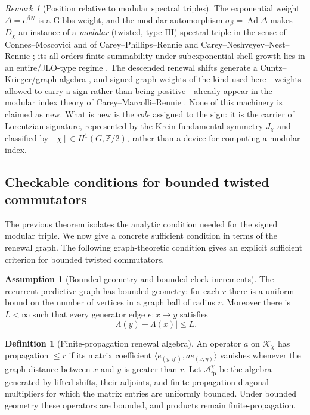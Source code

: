 \documentclass[11pt]{article}
\theoremstyle{definition}
\newtheorem{definition}[theorem]{Definition}
\newtheorem{assumption}{Assumption}[section]
\theoremstyle{remark}
\newtheorem{remark}[theorem]{Remark}
\newcommand{\Z}{\mathbb{Z}}
\newcommand{\Kh}{\mathcal{K}}
\begin{document}
\begin{remark}[Position relative to modular spectral triples]
\label{rem:modular-spectral-triple-lineage}
The exponential weight $\Delta=e^{\beta N}$ is a Gibbs weight, and the modular
automorphism $\sigma_\beta=\operatorname{Ad}\Delta$ makes $D_\chi$ an instance of
a \emph{modular} (twisted, type III) spectral triple in the sense of
Connes--Moscovici \cite{connes-moscovici} and of Carey--Phillips--Rennie and
Carey--Neshveyev--Nest--Rennie
\cite{careyphillipsrennie2010,careyneshveyevnestrennie2011}; its all-orders finite summability under subexponential shell growth lies in an entire/JLO-type
regime \cite{jlo1988}.  The descended renewal shifts generate a
Cuntz--Krieger/graph algebra \cite{cuntz,paskrennie2006}, and signed graph weights
of the kind used here---weights allowed to carry a sign rather than being
positive---already appear in the modular index theory of Carey--Marcolli--Rennie
\cite{careymarcollirennie2011}.  None of this machinery is claimed as new.  What
is new is the \emph{role} assigned to the sign: it is the carrier of Lorentzian
signature, represented by the Krein fundamental symmetry $J_\chi$ and classified
by $[\chi]\in H^1(G,\Z/2)$, rather than a device for computing a modular index.
\end{remark}


\subsection{Checkable conditions for bounded twisted commutators}
\label{subsec:checkable-modular}

The previous theorem isolates the analytic condition needed for the signed
modular triple.  We now give a concrete sufficient condition in terms of the
renewal graph.  The following graph-theoretic condition gives an explicit sufficient
criterion for bounded twisted commutators.

\begin{assumption}[Bounded geometry and bounded clock increments]
\label{ass:signed-bounded-geometry}
The recurrent predictive graph has bounded geometry: for each $r$ there is a
uniform bound on the number of vertices in a graph ball of radius $r$.  Moreover
there is $L<\infty$ such that every generator edge $e:x\to y$ satisfies
\[
  |\Lambda(y)-\Lambda(x)|\le L .
\]
\end{assumption}

\begin{definition}[Finite-propagation renewal algebra]
\label{def:finite-propagation}
An operator $a$ on $\Kh_\chi$ has propagation $\le r$ if its matrix coefficient
$\langle e_{(y,\eta')},a e_{(x,\eta)}\rangle$ vanishes whenever the graph
distance between $x$ and $y$ is greater than $r$.  Let
$\mathcal A_{\mathrm{fp}}^\chi$ be the algebra generated by lifted shifts,
their adjoints, and finite-propagation diagonal multipliers for which the
matrix entries are uniformly bounded.  Under bounded geometry these operators
are bounded, and products remain finite-propagation.
\end{definition}
\end{document}
